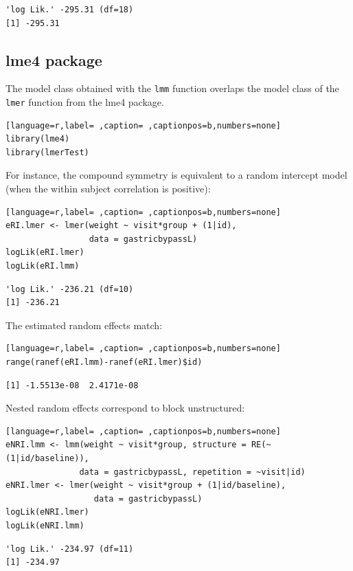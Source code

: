 \documentclass[12pt]{article}
\begin{document}
\begin{verbatim}
'log Lik.' -295.31 (df=18)
[1] -295.31
\end{verbatim}


\clearpage

\subsection{lme4 package}
\label{sec:org1a21edd}

The model class obtained with the \texttt{lmm} function overlaps the model
class of the \texttt{lmer} function from the lme4 package.
\begin{lstlisting}[language=r,label= ,caption= ,captionpos=b,numbers=none]
library(lme4)
library(lmerTest)
\end{lstlisting}

For instance, the compound symmetry is equivalent to a random
intercept model (when the within subject correlation is positive):
\begin{lstlisting}[language=r,label= ,caption= ,captionpos=b,numbers=none]
eRI.lmer <- lmer(weight ~ visit*group + (1|id),
                 data = gastricbypassL)
logLik(eRI.lmer)
logLik(eRI.lmm)
\end{lstlisting}

\begin{verbatim}
'log Lik.' -236.21 (df=10)
[1] -236.21
\end{verbatim}


The estimated random effects match:
\begin{lstlisting}[language=r,label= ,caption= ,captionpos=b,numbers=none]
range(ranef(eRI.lmm)-ranef(eRI.lmer)$id)
\end{lstlisting}

\begin{verbatim}
[1] -1.5513e-08  2.4171e-08
\end{verbatim}


Nested random effects correspond to block unstructured:
\begin{lstlisting}[language=r,label= ,caption= ,captionpos=b,numbers=none]
eNRI.lmm <- lmm(weight ~ visit*group, structure = RE(~(1|id/baseline)),
               data = gastricbypassL, repetition = ~visit|id)
eNRI.lmer <- lmer(weight ~ visit*group + (1|id/baseline),
                  data = gastricbypassL)
logLik(eNRI.lmer)
logLik(eNRI.lmm)
\end{lstlisting}

\begin{verbatim}
'log Lik.' -234.97 (df=11)
[1] -234.97
\end{verbatim}
\end{document}
